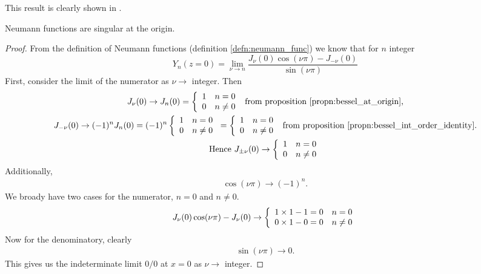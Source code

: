 This result is clearly shown in .

\begin{propn}\label{propn:neumann_singular_at_origin}
  Neumann functions are singular at the origin.
\end{propn}
%
\begin{proof}
  From the definition of Neumann functions (definition \ref{defn:neumann_func}) we know that for $n$ integer
    \begin{equation}
      Y_n(z=0) = \lim_{\nu \rightarrow n} \frac{J_\nu(0) \cos (\nu \pi) - J_{-\nu}(0)}{\sin (\nu \pi)}
    \end{equation}
  First, consider the limit of the numerator as $\nu \rightarrow$ integer. Then
    \begin{gather*}
      J_\nu(0) \rightarrow
        J_n(0) = \left\{
          \begin{array}{c l}
               1 & n = 0 \\
               0 & n \neq 0
          \end{array}\right. \text{ from proposition \ref{propn:bessel_at_origin},}\\
      J_{-\nu}(0) \rightarrow
        (-1)^nJ_n(0) = (-1)^n\left\{
          \begin{array}{c l}
               1 & n = 0 \\
               0 & n \neq 0
          \end{array}\right.
          = \left\{
            \begin{array}{c l}
                 1 & n = 0 \\
                 0 & n \neq 0
            \end{array}\right. \text{ from proposition \ref{propn:bessel_int_order_identity}.}\\
      \text{Hence } J_{\pm\nu}(0) \rightarrow
        \left\{
          \begin{array}{c l}
               1 & n = 0 \\
               0 & n \neq 0
          \end{array}\right.
    \end{gather*}
  Additionally,
    \begin{gather*}
      \cos(\nu\pi) \rightarrow (-1)^n.
    \end{gather*}
  We broady have two cases for the numerator, $n=0$ and $n\neq 0$.
    \begin{gather*}
      J_\nu(0)\cos(\nu\pi) - J_\nu(0) \rightarrow
      \left\{
        \begin{array}{c l}
             1\times1-1=0 & n = 0 \\
             0\times1-0=0 & n \neq 0
        \end{array}\right.
    \end{gather*}
  Now for the denominatory, clearly
    \begin{gather*}
      \sin(\nu\pi) \rightarrow 0.
    \end{gather*}
  This gives us the indeterminate limit $0/0$ at $x=0$ as $\nu \rightarrow$ integer.
\end{proof}
